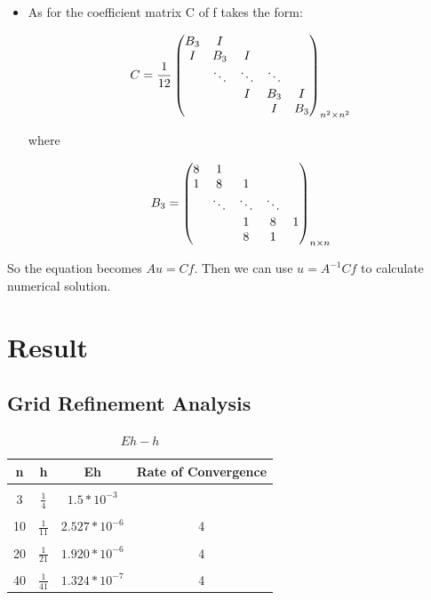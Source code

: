\documentclass[12pt]{report}
\theoremstyle{definition}
\begin{document}
\begin{itemize}
	\item As for the coefficient matrix C of f takes the form:
	
	\begin{equation*}
	C = \frac{1}{12} 
	\begin{pmatrix}
	B_3 & I \\
	I & B_3 & I \\
	& \ddots & \ddots & \ddots \\
	&&I & B_3 & I \\
	&&&I & B_3  \\
	\end{pmatrix}_{n^2 \times n^2}\\
	\end{equation*}
	
	where
	
	\begin{equation*}
	B_3= \begin{pmatrix} 
	8 & 1 \\
	1 & 8 & 1 \\
	& \ddots & \ddots & \ddots \\
	&&1 & 8 & 1 \\
	&&8 & 1  \\
	\end{pmatrix}_{n \times n}\\
	\end{equation*}
\end{itemize}

So the equation becomes $Au = Cf$. Then we can use $u = A^{-1}Cf$ to calculate numerical solution.

\section{Result}
	\subsection{Grid Refinement Analysis}
	\begin{table}
		\caption{$Eh-h$}
		\begin{center}
			\begin{tabular}{c|c|c|c}
				\textbf{n} & \textbf{h} & \textbf{Eh} & \textbf{Rate of Convergence}\\
				\hline
				&&&\\
				3 & $\frac{1}{4}$  & $1.5*10^{-3}$ &  \\
				&&&\\
				10 & $\frac{1}{11}$  & $2.527*10^{-6}$ & 4 \\
				&&&\\
				20 & $\frac{1}{21}$  & $1.920*10^{-6}$ & 4 \\
				&&&\\
				40 & $\frac{1}{41}$  & $1.324*10^{-7}$ & 4 \\
				
			\end{tabular}
		\end{center}
	\end{table}
\end{document}
